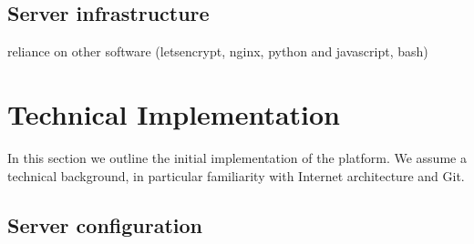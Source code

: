 \documentclass[12pt,twoside,vi]{mitthesis}
\newcommand{\draft}[1]{{\color{blue} #1}}
\begin{document}
\subsection{Server infrastructure}

\draft{reliance on other software (letsencrypt, nginx, python and javascript, bash)}

\section{Technical Implementation}

In this section we outline the initial implementation of the platform. We assume a technical background, in particular familiarity with Internet architecture and Git.

\subsection{Server configuration}
\end{document}
